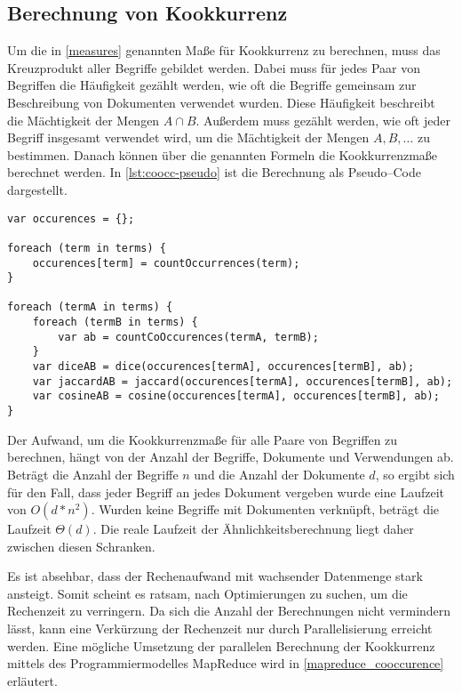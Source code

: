 \subsection{Berechnung von Kookkurrenz}

Um die in \cref{measures} genannten Maße für Kookkurrenz zu berechnen, muss das Kreuzprodukt aller Begriffe gebildet werden. Dabei muss für jedes Paar von Begriffen die Häufigkeit gezählt werden, wie oft die Begriffe gemeinsam zur Beschreibung von Dokumenten verwendet wurden. Diese Häufigkeit beschreibt die Mächtigkeit der Mengen \(A \cap B\). Außerdem muss gezählt werden, wie oft jeder Begriff insgesamt verwendet wird, um die Mächtigkeit der Mengen \(A, B, \dots\) zu bestimmen. Danach können über die genannten Formeln die Kookkurrenzmaße berechnet werden. In \cref{lst:coocc-pseudo} ist die Berechnung als Pseudo--Code dargestellt.

\begin{lstlisting}[language=pseudo, label={lst:coocc-pseudo}, caption={Kookkurrenzberechnung}, float]
var occurences = {};

foreach (term in terms) {
    occurences[term] = countOccurrences(term);
}

foreach (termA in terms) {
    foreach (termB in terms) {
        var ab = countCoOccurences(termA, termB);
    }
    var diceAB = dice(occurences[termA], occurences[termB], ab);
    var jaccardAB = jaccard(occurences[termA], occurences[termB], ab);
    var cosineAB = cosine(occurences[termA], occurences[termB], ab);
}
\end{lstlisting}

Der Aufwand, um die Kookkurrenzmaße für alle Paare von Begriffen zu berechnen, hängt von der Anzahl der Begriffe, Dokumente und Verwendungen ab. Beträgt die Anzahl der Begriffe \(n\) und die Anzahl der Dokumente \(d\), so ergibt sich für den Fall, dass jeder Begriff an jedes Dokument vergeben wurde eine Laufzeit von \(O(d*n^2)\). Wurden keine Begriffe mit Dokumenten verknüpft, beträgt die Laufzeit \(\Theta(d)\). Die reale Laufzeit der Ähnlichkeitsberechnung liegt daher zwischen diesen Schranken.

Es ist absehbar, dass der Rechenaufwand mit wachsender Datenmenge stark ansteigt. Somit scheint es ratsam, nach Optimierungen zu suchen, um die Rechenzeit zu verringern. Da sich die Anzahl der Berechnungen nicht vermindern lässt, kann eine Verkürzung der Rechenzeit nur durch Parallelisierung erreicht werden. Eine mögliche Umsetzung der parallelen Berechnung der Kookkurrenz mittels des Programmiermodelles  MapReduce wird in \cref{mapreduce_cooccurence} erläutert.

